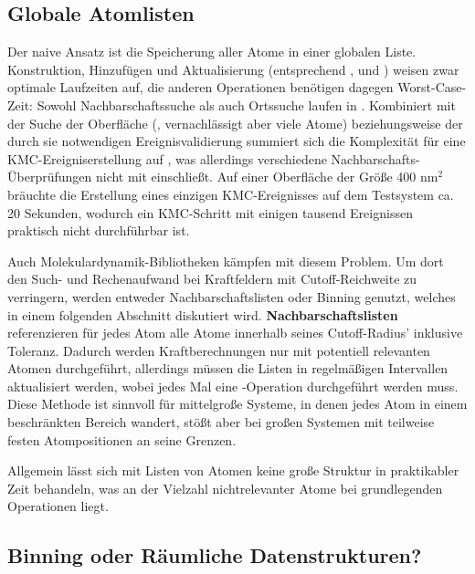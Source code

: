 \subsection{Globale Atomlisten}

Der naive Ansatz ist die Speicherung aller Atome in einer globalen Liste.
Konstruktion, Hinzufügen und Aktualisierung (entsprechend ,  und ) weisen zwar optimale Laufzeiten auf, die anderen Operationen benötigen dagegen Worst-Case-Zeit:
Sowohl Nachbarschaftssuche als auch Ortssuche laufen in .
Kombiniert mit der Suche der Oberfläche (, vernachlässigt aber viele Atome) beziehungsweise der durch sie notwendigen Ereignisvalidierung summiert sich die Komplexität für eine KMC-Ereigniserstellung auf , was allerdings verschiedene Nachbarschafts-Überprüfungen nicht mit einschließt.
Auf einer Oberfläche der Größe 400 nm$^2$ bräuchte die Erstellung eines einzigen KMC-Ereignisses auf dem Testsystem ca. 20 Sekunden, wodurch ein KMC-Schritt mit einigen tausend Ereignissen praktisch nicht durchführbar ist.

Auch Molekulardynamik-Bibliotheken kämpfen mit diesem Problem.
Um dort den Such- und Rechenaufwand bei Kraftfeldern mit Cutoff-Reichweite zu verringern, werden entweder Nachbarschaftslisten oder Binning genutzt, welches in einem folgenden Abschnitt diskutiert wird.
\textbf{Nachbarschaftslisten} referenzieren für jedes Atom alle Atome innerhalb seines Cutoff-Radius' inklusive Toleranz.
Dadurch werden Kraftberechnungen nur mit potentiell relevanten Atomen durchgeführt, allerdings müssen die Listen in regelmäßigen Intervallen aktualisiert werden, wobei jedes Mal eine -Operation durchgeführt werden muss.
Diese Methode ist sinnvoll für mittelgroße Systeme, in denen jedes Atom in einem beschränkten Bereich wandert, stößt aber bei großen Systemen mit teilweise festen Atompositionen an seine Grenzen.

Allgemein lässt sich mit Listen von Atomen keine große Struktur in praktikabler Zeit behandeln, was an der Vielzahl nichtrelevanter Atome bei grundlegenden Operationen liegt.

\subsection{Binning oder Räumliche Datenstrukturen?}


